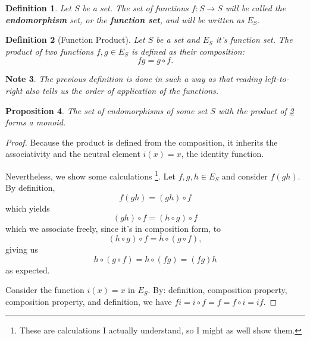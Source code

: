 \documentclass[11pt]{article}
\theoremstyle{plain}
\newtheorem{definition}{Definition}[section]
\newtheorem{note}[definition]{Note}
\newtheorem{proposition}[definition]{Proposition}
\theoremstyle{nonumberplain}
\newtheorem{proof}[definition]{Proof}
\begin{document}
\begin{definition}
    Let $S$ be a set. The set of functions $f : S \to S$ will be called the \textbf{endomorphism} set, or the \textbf{function set}, and will be written as $E_S$.
\end{definition}

\begin{definition}[Function Product] \label{def:function_product}
    Let $S$ be a set and $E_S$ it's function set. The product of two functions $f, g \in E_S$ is defined as their composition: \begin{equation}
        fg = g \circ f.
    \end{equation}
\end{definition}

\begin{note}
    The previous definition is done in such a way as that reading left-to-right also tells us the order of application of the functions.
\end{note}

\begin{proposition}
    The set of endomorphisms of some set $S$ with the product of \ref{def:function_product} forms a monoid.
\end{proposition}

\begin{proof}
    Because the product is defined from the composition, it inherits the associativity and the neutral element $i(x) = x$, the identity function.

    Nevertheless, we show some calculations \footnote{These are calculations I actually understand, so I might as well show them.}. Let $f, g, h \in E_S$ and consider $f(gh)$. By definition, \begin{equation}
        f(gh) = (gh) \circ f
    \end{equation}
    which yields \begin{equation}
        (gh) \circ f = (h \circ g) \circ f
    \end{equation}
    which we associate freely, since it's in composition form, to \begin{equation}
        (h \circ g) \circ f = h \circ (g \circ f),
    \end{equation}
    giving us \begin{equation}
        h \circ (g \circ f) = h \circ (fg) = (fg)h
    \end{equation}
    as expected.

    Consider the function $i(x) = x$ in $E_S$. By: definition, composition property, composition property, and definition, we have $fi = i \circ f = f = f \circ i = if$.
\end{proof}
\end{document}
